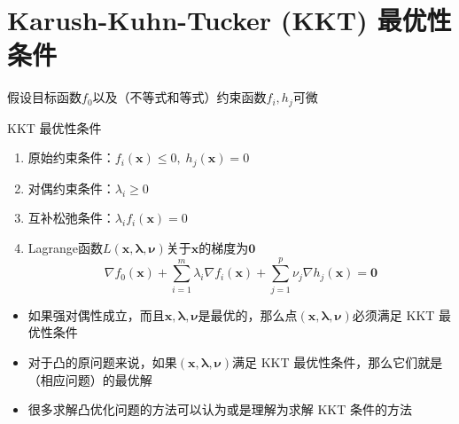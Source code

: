 
\section{Karush-Kuhn-Tucker (KKT) 最优性条件}


\begin{frame}

假设目标函数$f_0$以及（不等式和等式）约束函数$f_i,h_j$可微

\pause

\begin{block}{KKT 最优性条件}
\begin{enumerate}
\item 原始约束条件：$f_i(\mathbf{x}) \le 0, \; h_j(\mathbf{x}) = 0$
\item 对偶约束条件：$\lambda_i \ge 0$
\item 互补松弛条件：$\lambda_if_i(\mathbf{x}) = 0$
\item Lagrange函数$L(\mathbf{x}, \boldsymbol\lambda, \boldsymbol\nu)$关于$\mathbf{x}$的梯度为$\mathbf{0}$
$$\nabla f_0(\mathbf{x}) + \sum\limits_{i=1}^m \lambda_i \nabla f_i(\mathbf{x}) + \sum\limits_{j=1}^p \nu_j \nabla h_j(\mathbf{x}) = \mathbf{0}$$
\end{enumerate}
\end{block}

\end{frame}


\begin{frame}

\begin{itemize}
\item 如果强对偶性成立，而且$\mathbf{x}, \boldsymbol\lambda, \boldsymbol\nu$是最优的，那么点$(\mathbf{x}, \boldsymbol\lambda, \boldsymbol\nu)$必须满足 KKT 最优性条件
\vspace{0.5em}
\item 对于凸的原问题来说，如果$(\mathbf{x}, \boldsymbol\lambda, \boldsymbol\nu)$满足 KKT 最优性条件，那么它们就是（相应问题）的最优解
\vspace{0.5em}
\item 很多求解凸优化问题的方法可以认为或是理解为求解 KKT 条件的方法
\end{itemize}

\end{frame}

